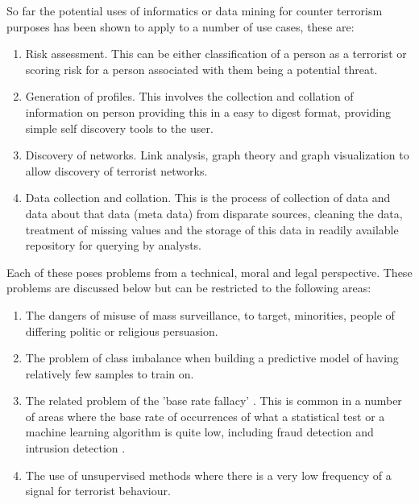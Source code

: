 So far the potential uses of informatics or data mining for counter terrorism purposes has been shown to apply to a number of use cases, these are:
\begin{enumerate}
\item Risk assessment. This can be either classification of a person as a terrorist or scoring risk for a person associated with them being a potential threat.
\item Generation of profiles. This involves the collection and collation of information on person providing this in a  easy to digest format, providing simple self discovery tools to the user.
\item Discovery of networks. Link analysis, graph theory and graph visualization to allow discovery of terrorist networks.
\item Data collection and collation. This is the process of collection of data and data about that data (meta data) from disparate sources, cleaning the data, treatment of missing values and the storage of this data in readily available repository for querying by analysts.
\end{enumerate}

Each of these poses problems from a technical, moral and legal perspective. These problems are discussed below but can be restricted to the following areas:
\begin{enumerate}
\item The dangers of misuse of mass surveillance, to target, minorities, people of differing politic or religious persuasion.
\item The problem of class imbalance when building a predictive model of having relatively few samples to train on.
\item The related problem of the 'base rate fallacy' \citep{bar1980base}. This is common in a number of areas where the base rate of occurrences of what a statistical test or a machine learning algorithm is quite low, including fraud detection and intrusion detection \citep{axelsson2000base}.
\item The use of unsupervised methods where there is a very low frequency of a signal for terrorist behaviour.
\end{enumerate}

